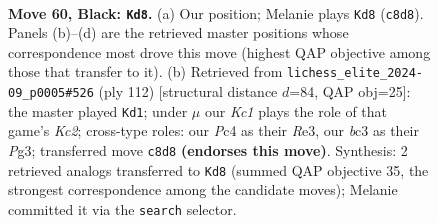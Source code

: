 \documentclass[11pt]{article}
\begin{document}
\begin{figure}[p]\centering
\begin{subfigure}{0.46\textwidth}\centering
\resizebox{\linewidth}{!}{%
\newchessgame
\chessboard[
  setfen={2k1rb2/6p1/p1p4r/Pp1b1p1p/2p2P1P/2B1PNP1/1P2K3/1R4R1 b - - 22 60},
  showmover=false,
  pgfstyle=straightmove, color=movearrow, markmove={c8-d8}
]}
\caption{}
\end{subfigure}\hfill
\begin{subfigure}{0.46\textwidth}\centering
\resizebox{\linewidth}{!}{%
\newchessgame
\chessboard[
  setfen={4r2r/2kb1p2/4p1p1/1p1pP2p/pP3P2/P1P1R1P1/2KRB2P/8 w - - 53 57},
  showmover=false,
  pgfstyle=straightmove, color=movearrow, markmove={c2-d1}
]}
\caption{}
\end{subfigure}
\\[4pt]

\caption{\textbf{Move 60, Black: \texttt{Kd8}.} (a) Our position; Melanie plays \texttt{Kd8} (\texttt{c8d8}). Panels (b)--(d) are the retrieved master positions whose correspondence most drove this move (highest QAP objective among those that transfer to it). (b) Retrieved from \texttt{lichess\_elite\_2024-09\_p0005\#526} (ply 112) [structural distance $d$=84, QAP obj=25]: the master played \texttt{Kd1}; under $\mu$ our \emph{Kc1} plays the role of that game's \emph{Kc2}; cross-type roles: our \emph{P}c4 as their \emph{R}e3, our \emph{b}c3 as their \emph{P}g3; transferred move \texttt{c8d8} \textbf{(endorses this move)}. Synthesis: 2 retrieved analogs transferred to \texttt{Kd8} (summed QAP objective 35, the strongest correspondence among the candidate moves); Melanie committed it via the \texttt{search} selector.}
\label{fig:thought-m119}
\end{figure}

\clearpage
\end{document}

